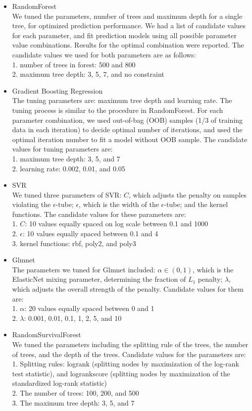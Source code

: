 \documentclass[a4paper,12pt]{article}
\begin{document}
\begin{itemize}
		\item RandomForest\\
		We tuned the parameters, number of trees and maximum depth for a single tree, for optimized prediction performance. We had a list of candidate values for each parameter, and fit prediction models using all possible parameter value combinations. Results for the optimal combination were reported. The candidate values we used for both parameters are as follows:\\
		1. number of trees in forest: 500 and 800\\
		2. maximum tree depth: 3, 5, 7, and no constraint
		\item Gradient Boosting Regression\\
		The tuning parameters are: maximum tree depth and learning rate. The tuning process is similar to the procedure in RandomForest. For each parameter combination, we used out-of-bag (OOB) samples (1/3 of training data in each iteration) to decide optimal number of iterations, and used the optimal iteration number to fit a model without OOB sample. The candidate values for tuning parameters are:\\
		1. maximum tree depth: 3, 5, and 7\\
		2. learning rate: 0.002, 0.01, and 0.05
		\item SVR\\
		We tuned three parameters of SVR: $C$, which adjusts the penalty on samples violating the $\epsilon$-tube; $\epsilon$, which is the width of the $\epsilon$-tube; and the kernel functions. The candidate values for these parameters are:\\
		1. $C$: 10 values equally spaced on log scale between 0.1 and 1000\\
		2. $\epsilon$: 10 values equally spaced between 0.1 and 4\\
		3. kernel functions: rbf, poly2, and poly3
		
		\item Glmnet\\
		The parameters we tuned for Glmnet included:  $\alpha \in (0, 1)$, which is the ElasticNet mixing parameter, determining the fraction of $L_1$ penalty; $\lambda$, which adjusts the overall strength of the penalty. Candidate values for them are:\\
		1.	$\alpha$: 20 values equally spaced between 0 and 1\\
		2.	$\lambda$: 0.001, 0.01, 0.1, 1, 2, 5, and 10
		\item RandomSurvivalForest\\
		We tuned the parameters including the splitting rule of the trees, the number of trees, and the depth of the trees. Candidate values for the parameters are:\\
		1.	Splitting rules: logrank (splitting nodes by maximization of the log-rank test statistic), and logrankscore (splitting nodes by maximization of the standardized log-rank statistic)\\
		2.	The number of trees: 100, 200, and 500\\
		3.	The maximum tree depth: 3, 5, and 7
		

\end{itemize}
\end{document}
